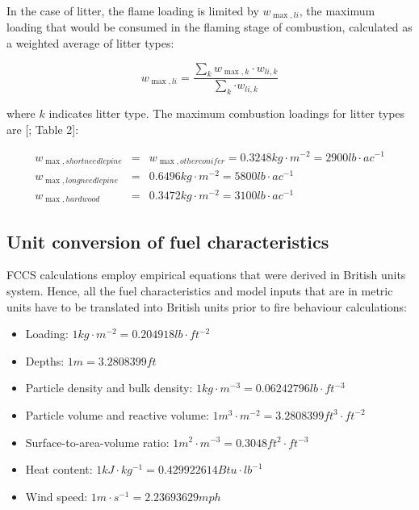 \documentclass[]{book}
\providecommand{\tightlist}{%
  \setlength{\itemsep}{0pt}\setlength{\parskip}{0pt}}
\begin{document}
In the case of litter, the flame loading is limited by \(w_{\max,li}\),
the maximum loading that would be consumed in the flaming stage of
combustion, calculated as a weighted average of litter types:

\begin{equation}
 w_{\max,li} = \frac{\sum_{k}{ w_{\max,k}\cdot w_{li,k}}}{\sum_{k} {\cdot w_{li,k}}}
\end{equation}

where \(k\) indicates litter type. The maximum combustion loadings for
litter types are {[}\citet{Prichard2013}; Table 2{]}:

\begin{eqnarray}
w_{\max,shortneedlepine} &=& w_{\max,otherconifer} = 0.3248 kg \cdot m^{-2} = 2900 lb\cdot ac^{-1} \\
w_{\max,longneedlepine} &=& 0.6496 kg \cdot m^{-2}= 5800 lb\cdot ac^{-1} \\
w_{\max,hardwood} &=& 0.3472 kg \cdot m^{-2}= 3100 lb\cdot ac^{-1} 
\end{eqnarray}

\subsection{Unit conversion of fuel
characteristics}\label{unit-conversion-of-fuel-characteristics}

FCCS calculations employ empirical equations that were derived in
British units system. Hence, all the fuel characteristics and model
inputs that are in metric units have to be translated into British units
prior to fire behaviour calculations:

\begin{itemize}
\tightlist
\item
  Loading: \(1 kg\cdot m^{-2} = 0.204918 lb\cdot ft^{-2}\)
\item
  Depths: \(1m = 3.2808399ft\)
\item
  Particle density and bulk density:
  \(1 kg\cdot m^{-3} = 0.06242796 lb\cdot ft^{-3}\)
\item
  Particle volume and reactive volume:
  \(1 m^{3}\cdot m^{-2} = 3.2808399 ft^{3}\cdot ft^{-2}\)
\item
  Surface-to-area-volume ratio:
  \(1 m^{2}\cdot m^{-3} = 0.3048 ft^{2}\cdot ft^{-3}\)
\item
  Heat content: \(1kJ\cdot kg^{-1} = 0.429922614 Btu\cdot lb^{-1}\)
\item
  Wind speed: \(1 m \cdot s^{-1} = 2.23693629 mph\)
\end{itemize}
\end{document}
